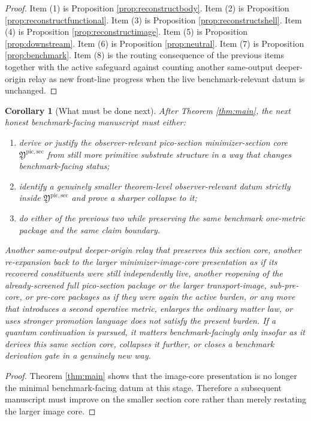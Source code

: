 \documentclass[11pt]{article}
\newcommand{\PicoMinSectionCore}{\mathfrak Y^{\mathrm{pic,sec}}}
\newtheorem{corollary}{Corollary}
\begin{document}
\begin{proof}
Item (1) is Proposition \ref{prop:reconstructbody}. Item (2) is Proposition \ref{prop:reconstructfunctional}. Item (3) is Proposition \ref{prop:reconstructshell}. Item (4) is Proposition \ref{prop:reconstructimage}. Item (5) is Proposition \ref{prop:downstream}. Item (6) is Proposition \ref{prop:neutral}. Item (7) is Proposition \ref{prop:benchmark}. Item (8) is the routing consequence of the previous items together with the active safeguard against counting another same-output deeper-origin relay as new front-line progress when the live benchmark-relevant datum is unchanged.
\end{proof}

\begin{corollary}[What must be done next]
\label{cor:next}
After Theorem \ref{thm:main}, the next honest benchmark-facing manuscript must either:
\begin{enumerate}
    \item derive or justify the observer-relevant pico-section minimizer-section core \(\PicoMinSectionCore\) from still more primitive substrate structure in a way that changes benchmark-facing status;
    \item identify a genuinely smaller theorem-level observer-relevant datum strictly inside \(\PicoMinSectionCore\) and prove a sharper collapse to it;
    \item do either of the previous two while preserving the same benchmark one-metric package and the same claim boundary.
\end{enumerate}
Another same-output deeper-origin relay that preserves this section core, another re-expansion back to the larger minimizer-image-core presentation as if its recovered constituents were still independently live, another reopening of the already-screened full pico-section package or the larger transport-image, sub-pre-core, or pre-core packages as if they were again the active burden, or any move that introduces a second operative metric, enlarges the ordinary matter law, or uses stronger promotion language does not satisfy the present burden. If a quantum continuation is pursued, it matters benchmark-facingly only insofar as it derives this same section core, collapses it further, or closes a benchmark derivation gate in a genuinely new way.
\end{corollary}

\begin{proof}
Theorem \ref{thm:main} shows that the image-core presentation is no longer the minimal benchmark-facing datum at this stage. Therefore a subsequent manuscript must improve on the smaller section core rather than merely restating the larger image core.
\end{proof}
\end{document}
